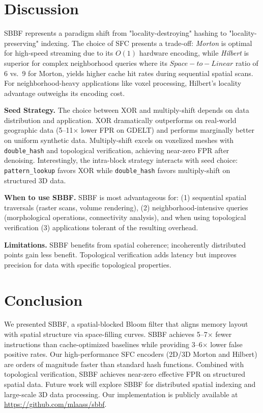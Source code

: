\documentclass[conference,a4paper]{IEEEtran}
\begin{document}
\section{Discussion}
SBBF represents a paradigm shift from "locality-destroying" hashing to "locality-preserving" indexing. The choice of SFC presents a trade-off: \emph{Morton} is optimal for high-speed streaming due to its $O(1)$ hardware encoding, while \emph{Hilbert} is superior for complex neighborhood queries where its $Space-to-Linear$ ratio of 6 vs.\ 9 for Morton, yields higher cache hit rates during sequential spatial scans. For neighborhood-heavy applications like voxel processing, Hilbert's locality advantage outweighs its encoding cost.

\textbf{Seed Strategy.} The choice between XOR and multiply-shift depends on data distribution and application. XOR dramatically outperforms on real-world geographic data (5--11$\times$ lower FPR on GDELT) and performs marginally better on uniform synthetic data. Multiply-shift excels on voxelized meshes with \texttt{double\_hash} and topological verification, achieving near-zero FPR after denoising. Interestingly, the intra-block strategy interacts with seed choice: \texttt{pattern\_lookup} favors XOR while \texttt{double\_hash} favors multiply-shift on structured 3D data.

\textbf{When to use SBBF.} SBBF is most advantageous for: (1) sequential spatial traversals (raster scans, volume rendering), (2) neighborhood-intensive queries (morphological operations, connectivity analysis), and when using topological verification (3) applications tolerant of the resulting overhead.

\textbf{Limitations.} SBBF benefits from spatial coherence; incoherently distributed points gain less benefit. Topological verification adds latency but improves precision for data with specific topological properties.

\section{Conclusion}
We presented SBBF, a spatial-blocked Bloom filter that aligns memory layout with spatial structure via space-filling curves. SBBF achieves 5--7$\times$ fewer instructions than cache-optimized baselines while providing 3--6$\times$ lower false positive rates. Our high-performance SFC encoders (2D/3D Morton and Hilbert) are orders of magnitude faster than standard hash functions. Combined with topological verification, SBBF achieves near-zero effective FPR on structured spatial data. Future work will explore SBBF for distributed spatial indexing and large-scale 3D data processing. Our implementation is publicly available at \url{https://github.com/mlaass/sbbf}.

\small


\end{document}
